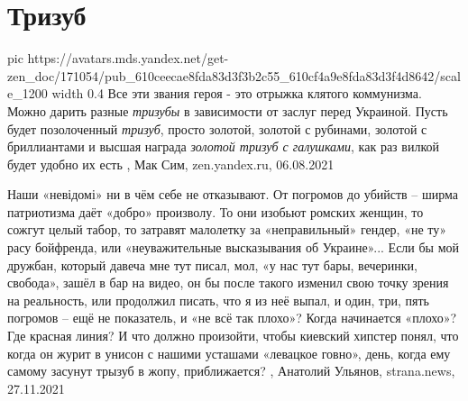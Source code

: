  
 
 
 
 
\chapter{Тризуб}
\label{sec:slova.trizub}

\ifcmt
  pic https://avatars.mds.yandex.net/get-zen_doc/171054/pub_610ceecae8fda83d3f3b2c55_610cf4a9e8fda83d3f4d8642/scale_1200
  width 0.4
\fi
Все эти звания героя - это отрыжка клятого коммунизма. Можно дарить разные
\emph{тризубы} в зависимости от заслуг перед Украиной. Пусть будет позолоченный
\emph{тризуб}, просто золотой, золотой с рубинами, золотой с бриллиантами и высшая
награда \emph{золотой тризуб с галушками}, как раз вилкой будет удобно их есть
, 
Мак Сим, zen.yandex.ru, 06.08.2021

Наши «невідомі» ни в чём себе не отказывают. От погромов до убийств – ширма
патриотизма даёт «добро» произволу. То они изобьют ромских женщин, то сожгут
целый табор, то затравят малолетку за «неправильный» гендер, «не ту» расу
бойфренда, или «неуважительные высказывания об Украине»...
Если бы мой дружбан, который давеча мне тут писал, мол, «у нас тут бары,
вечеринки, свобода», зашёл в бар на видео, он бы после такого изменил свою
точку зрения на реальность, или продолжил писать, что я из неё выпал, и один,
три, пять погромов – ещё не показатель, и «не всё так плохо»? Когда начинается
«плохо»? Где красная линия? И что должно произойти, чтобы киевский хипстер
понял, что когда он журит в унисон с нашими усташами «левацкое говно», день,
когда ему самому засунут трызуб в жопу, приближается?
, 
Анатолий Ульянов, strana.news, 27.11.2021
